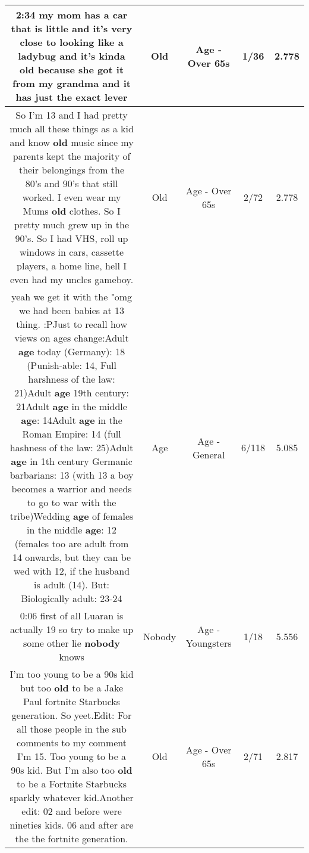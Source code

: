 \documentclass[11pt]{article}
\newlength\mylength
\begin{document}
\begin{center}
\begin{longtable}{|C{.65\mylength}|C{.30\mylength}|C{.12\mylength}|C{.12\mylength}|C{.12\mylength}|}
  \small 2:34 my mom has a car that is little and it's very close to looking like a ladybug and it's kinda \textbf{old} because she got it from my grandma and it has just the exact lever\normalsize   & Old & Age - Over 65s & 1/36 & 2.778 \\  \hline
  \small So I'm 13 and I had pretty much all these things as a kid and know \textbf{old} music since my parents kept the majority of their belongings from the 80's and 90's that still worked. I even wear my Mums \textbf{old} clothes. So I pretty much grew up in the 90's. So I had VHS, roll up windows in cars, cassette players, a home line, hell I even had my uncles gameboy.\normalsize   & Old & Age - Over 65s & 2/72 & 2.778 \\  \hline
  \small yeah we get it with the "omg we had been babies at 13 thing. :PJust to recall how views on ages change:Adult \textbf{age} today (Germany): 18 (Punish-able: 14, Full harshness of the law: 21)Adult \textbf{age} 19th century: 21Adult \textbf{age} in the middle \textbf{age}: 14Adult \textbf{age} in the Roman Empire: 14 (full hashness of the law: 25)Adult \textbf{age} in 1th century Germanic barbarians: 13 (with 13 a boy becomes a warrior and needs to go to war with the tribe)Wedding \textbf{age} of females in the middle \textbf{age}: 12 (females too are adult from 14 onwards, but they can be wed with 12, if the husband is adult (14). But: Biologically adult: 23-24\normalsize   & Age & Age - General & 6/118 & 5.085 \\  \hline
  \small 0:06 first of all Luaran is actually 19 so try to make up some other lie \textbf{nobody} knows\normalsize   & Nobody & Age - Youngsters & 1/18 & 5.556 \\  \hline
  \small I'm too young to be a 90s kid but too \textbf{old} to be a Jake Paul fortnite Starbucks generation. So yeet.Edit: For all those people in the sub comments to my comment I'm 15. Too young to be a 90s kid. But I'm also too \textbf{old} to be a Fortnite Starbucks sparkly whatever kid.Another edit: 02 and before were nineties kids. 06 and after are the the fortnite generation.\normalsize   & Old & Age - Over 65s & 2/71 & 2.817 \\  \hline

\end{longtable}
\end{center}
\end{document}
